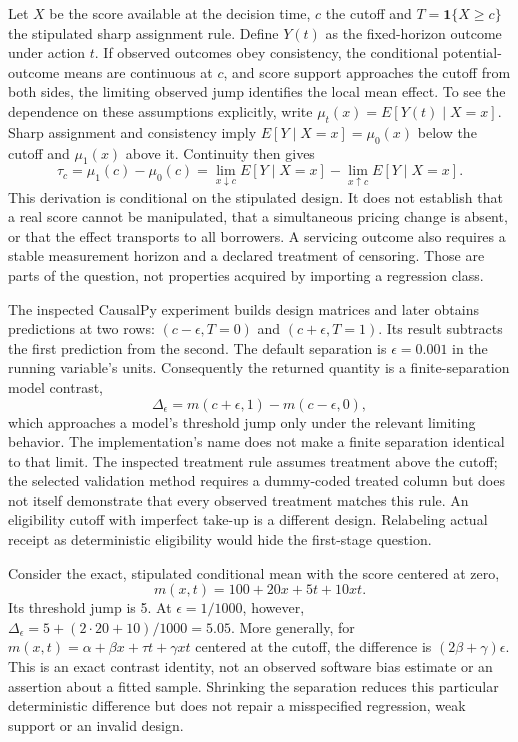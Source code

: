 Let $X$ be the score available at the decision time, $c$ the cutoff and
$T=\mathbf{1}\{X\geq c\}$ the stipulated sharp assignment rule. Define $Y(t)$ as
the fixed-horizon outcome under action $t$. If observed outcomes obey consistency,
the conditional potential-outcome means are continuous at $c$, and score support
approaches the cutoff from both sides, the limiting observed jump identifies
the local mean effect. To see the dependence on these assumptions explicitly,
write $\mu_t(x)=E[Y(t)\mid X=x]$. Sharp assignment and consistency imply
$E[Y\mid X=x]=\mu_0(x)$ below the cutoff and $\mu_1(x)$ above it. Continuity
then gives
\[
 \tau_c=\mu_1(c)-\mu_0(c)
 =\lim_{x\downarrow c}E[Y\mid X=x]-\lim_{x\uparrow c}E[Y\mid X=x].
\]
This derivation is conditional on the stipulated design. It does not establish
that a real score cannot be manipulated, that a simultaneous pricing change is
absent, or that the effect transports to all borrowers. A servicing outcome also
requires a stable measurement horizon and a declared treatment of censoring.
Those are parts of the question, not properties acquired by importing a regression
class.~\citep{exec14_causalpy_exact,exec14_causalpy_decision}

The inspected CausalPy experiment builds design matrices and later obtains
predictions at two rows: $(c-\epsilon,T=0)$ and $(c+\epsilon,T=1)$. Its result
subtracts the first prediction from the second. The default separation is
$\epsilon=0.001$ in the running variable's units. Consequently the returned
quantity is a finite-separation model contrast,
\[
 \Delta_\epsilon=m(c+\epsilon,1)-m(c-\epsilon,0),
\]
which approaches a model's threshold jump only under the relevant limiting
behavior. The implementation's name does not make a finite separation identical
to that limit. The inspected treatment rule assumes treatment above the cutoff;
the selected validation method requires a dummy-coded treated column but does
not itself demonstrate that every observed treatment matches this rule.
An eligibility cutoff with imperfect take-up is a different design. Relabeling
actual receipt as deterministic eligibility would hide the first-stage question.
\citep{exec14_causalpy_primary}

Consider the exact, stipulated conditional mean with the score centered at zero,
\[
 m(x,t)=100+20x+5t+10xt.
\]
Its threshold jump is 5. At $\epsilon=1/1000$, however,
$\Delta_\epsilon=5+(2\cdot20+10)/1000=5.05$.
More generally, for $m(x,t)=\alpha+\beta x+\tau t+\gamma xt$ centered at the cutoff,
the difference is $(2\beta+\gamma)\epsilon$. This is an exact contrast identity,
not an observed software bias estimate or an assertion about a fitted sample.
Shrinking the separation reduces this particular deterministic difference but
does not repair a misspecified regression, weak support or an invalid design.
\citep{exec14_causalpy_exact}

